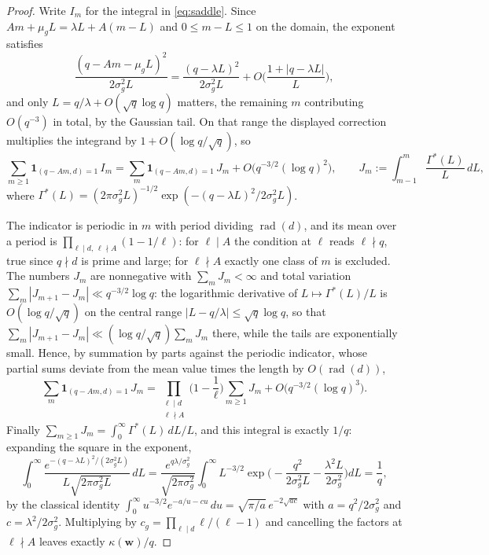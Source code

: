 \documentclass[11pt,reqno]{amsart}
\theoremstyle{plain}
\theoremstyle{definition}
\DeclareMathOperator{\rad}{rad}
\begin{document}
\begin{proof}
Write $I_m$ for the integral in \eqref{eq:saddle}. Since $Am+\mu_gL=\lambda L+A(m-L)$ and $0\le m-L\le1$ on the domain, the exponent satisfies
\[
\frac{(q-Am-\mu_gL)^{2}}{2\sigma_g^{2}L}=\frac{(q-\lambda L)^{2}}{2\sigma_g^{2}L}+O\Big(\frac{1+|q-\lambda L|}{L}\Big),
\]
and only $L=q/\lambda+O(\sqrt q\log q)$ matters, the remaining $m$ contributing $O(q^{-3})$ in total, by the Gaussian tail. On that range the displayed correction multiplies the integrand by $1+O(\log q/\sqrt q)$, so
\[
\sum_{m\ge1}\mathbf 1_{(q-Am,d)=1}\,I_m
=\sum_{m}\mathbf 1_{(q-Am,d)=1}\,J_m+O\big(q^{-3/2}(\log q)^{2}\big),
\qquad
J_m:=\int_{m-1}^{m}\frac{\Gamma^{*}(L)}{L}\,dL,
\]
where $\Gamma^{*}(L)=(2\pi\sigma_g^{2}L)^{-1/2}\exp(-(q-\lambda L)^{2}/2\sigma_g^{2}L)$.

The indicator is periodic in $m$ with period dividing $\rad(d)$, and its mean over a period is $\prod_{\ell\mid d,\,\ell\nmid A}(1-1/\ell)$: for $\ell\mid A$ the condition at $\ell$ reads $\ell\nmid q$, true since $q\nmid d$ is prime and large; for $\ell\nmid A$ exactly one class of $m$ is excluded. The numbers $J_m$ are nonnegative with $\sum_m J_m<\infty$ and total variation $\sum_m|J_{m+1}-J_m|\ll q^{-3/2}\log q$: the logarithmic derivative of $L\mapsto\Gamma^{*}(L)/L$ is $O(\log q/\sqrt q)$ on the central range $|L-q/\lambda|\le\sqrt q\log q$, so that $\sum_m|J_{m+1}-J_m|\ll(\log q/\sqrt q)\sum_mJ_m$ there, while the tails are exponentially small. Hence, by summation by parts against the periodic indicator, whose partial sums deviate from the mean value times the length by $O(\rad(d))$,
\[
\sum_{m}\mathbf 1_{(q-Am,d)=1}\,J_m
=\prod_{\substack{\ell\mid d\\ \ell\nmid A}}\Big(1-\frac1\ell\Big)\sum_{m\ge1}J_m
+O\big(q^{-3/2}(\log q)^{3}\big).
\]
Finally $\sum_{m\ge1}J_m=\int_{0}^{\infty}\Gamma^{*}(L)\,dL/L$, and this integral is exactly $1/q$: expanding the square in the exponent,
\[
\int_0^\infty\frac{e^{-(q-\lambda L)^{2}/(2\sigma_g^{2}L)}}{L\sqrt{2\pi\sigma_g^{2}L}}\,dL
=\frac{e^{q\lambda/\sigma_g^{2}}}{\sqrt{2\pi\sigma_g^{2}}}
\int_0^\infty L^{-3/2}\exp\Big(-\frac{q^{2}}{2\sigma_g^{2}L}-\frac{\lambda^{2}L}{2\sigma_g^{2}}\Big)dL
=\frac1q,
\]
by the classical identity $\int_0^\infty u^{-3/2}e^{-a/u-cu}\,du=\sqrt{\pi/a}\,e^{-2\sqrt{ac}}$ with $a=q^{2}/2\sigma_g^{2}$ and $c=\lambda^{2}/2\sigma_g^{2}$. Multiplying by $c_g=\prod_{\ell\mid d}\ell/(\ell-1)$ and cancelling the factors at $\ell\nmid A$ leaves exactly $\kappa(\mathbf w)/q$.
\end{proof}
\end{document}

